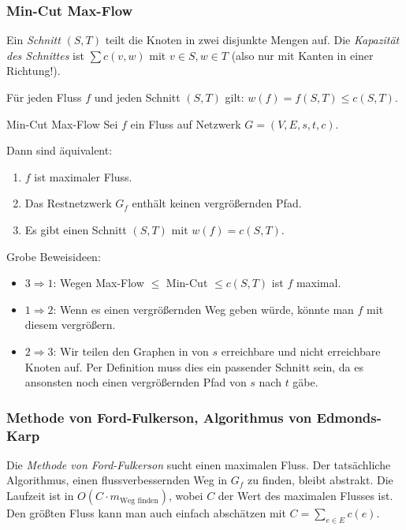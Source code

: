 \documentclass{panikzettel}
\begin{document}
\subsubsection{Min-Cut Max-Flow}

Ein \emph{Schnitt} $(S,T)$ teilt die Knoten in zwei disjunkte Mengen auf. Die \emph{Kapazität des Schnittes} ist $\sum c(v,w)$ mit $v \in S, w \in T$ (also nur mit Kanten in einer Richtung!).

Für jeden Fluss $f$ und jeden Schnitt $(S,T)$ gilt: $w(f) = f(S,T) \leq c(S,T)$.
\medbreak

\begin{theo}{Min-Cut Max-Flow}
Sei $f$ ein Fluss auf Netzwerk $G = (V,E,s,t,c)$. \par
Dann sind äquivalent:
\begin{enumerate}
    \item $f$ ist maximaler Fluss.
    \item Das Restnetzwerk $G_f$ enthält keinen vergrößernden Pfad.
    \item Es gibt einen Schnitt $(S,T)$ mit $w(f) = c(S,T)$.
\end{enumerate}
\end{theo}
\filbreak

Grobe Beweisideen:
\begin{itemize}
    \item $3 \Rightarrow 1$: Wegen Max-Flow $\leq$ Min-Cut $\leq c(S, T)$  ist $f$ maximal.
    \item $1 \Rightarrow 2$: Wenn es einen vergrößernden Weg geben würde, könnte man $f$ mit diesem vergrößern.
    \item $2 \Rightarrow 3$: Wir teilen den Graphen in von $s$ erreichbare und nicht erreichbare Knoten auf. Per Definition muss dies ein passender Schnitt sein, da es ansonsten noch einen vergrößernden Pfad von $s$ nach $t$ gäbe.
\end{itemize}

\subsubsection{Methode von Ford-Fulkerson, Algorithmus von Edmonds-Karp}

Die \emph{Methode von Ford-Fulkerson} sucht einen maximalen Fluss. Der tatsächliche Algorithmus, einen flussverbessernden Weg in $G_f$ zu finden, bleibt abstrakt. Die Laufzeit ist in $O(C \cdot m_\text{Weg finden})$, wobei $C$ der Wert des maximalen Flusses ist.
Den größten Fluss kann man auch einfach abschätzen mit $C = \sum_{e \in E} c(e)$.
\end{document}
